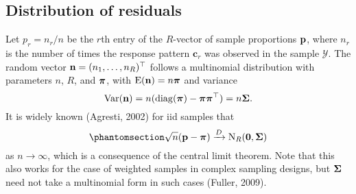 \documentclass[
  letterpaper,
  DIV=11,
  numbers=noendperiod]{scrartcl}
\begin{document}
\subsection{Distribution of residuals}\label{distribution-of-residuals}

Let \(p_r = n_r / n\) be the \(r\)th entry of the \(R\)-vector of sample
proportions \({\mathbf p}\), where \(n_r\) is the number of times the response
pattern \(\mathbf c_r\) was observed in the sample \(\mathcal Y\). The
random vector \({\mathbf n} = (n_1,\dots,n_R)^\top\) follows a multinomial
distribution with parameters \(n\), \(R\), and \({\boldsymbol\pi}\), with
\(\operatorname{E}({\mathbf n})=n{\boldsymbol\pi}\) and variance \[
\operatorname{Var}({\mathbf n}) = n (\operatorname{diag}({\boldsymbol\pi}) - {\boldsymbol\pi} {\boldsymbol\pi}^\top) = n {\boldsymbol\Sigma}.
\] It is widely known (Agresti, 2002) for iid samples that
\begin{equation}\phantomsection\label{eq-clt-prop}{
\sqrt{n} (\bp - \bpi) \xrightarrow{D} {\N}_R(\bzero, \bSigma)
}\end{equation} as \(n\to\infty\), which is a consequence of the central
limit theorem. Note that this also works for the case of weighted
samples in complex sampling designs, but \({\boldsymbol\Sigma}\) need not take a
multinomial form in such cases (Fuller, 2009).
\end{document}
